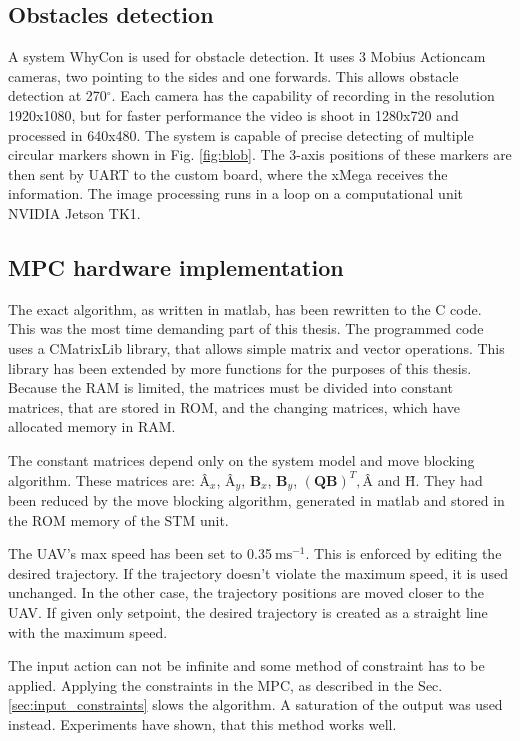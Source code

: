 \documentclass[a4paper,11pt,titlepage]{article}
\newcommand{\jed}[1]{\ensuremath{~\mathrm{#1}}}
\begin{document}
\subsection{Obstacles detection}
A system WhyCon\cite{whycon_icar}\cite{whycon_jint} is used for obstacle detection. It uses 3 Mobius Actioncam cameras, two pointing to the sides and one forwards. This allows obstacle detection at 270$^\circ$. Each camera has the capability of recording in the resolution 1920x1080, but for faster performance the video is shoot in 1280x720 and processed in 640x480. The system is capable of precise detecting of multiple circular markers shown in Fig. \ref{fig:blob}. The 3-axis positions of these markers are then sent by UART to the custom board, where the xMega receives the information. The image processing runs in a loop on a computational unit NVIDIA Jetson TK1.

\subsection{MPC hardware implementation}

The exact algorithm, as written in matlab, has been rewritten to the C code. This was the most time demanding part of this thesis. The programmed code uses a CMatrixLib library, that allows simple matrix and vector operations. This library has been extended by more functions for the purposes of this thesis. Because the RAM is limited, the matrices must be divided into constant matrices, that are stored in ROM, and the changing matrices, which have allocated memory in RAM.

The constant matrices depend only on the system model and move blocking algorithm. These matrices are: $\textbf{\^A}_x$, $\textbf{\^A}_y$, $\textbf{\^B}_x$, $\textbf{\^B}_y$, $(\textbf{\^Q}\textbf{\^B})^T, \textbf{\^A}$ and $\textbf{\^H}$. They had been reduced by the move blocking algorithm, generated in matlab and stored in the ROM memory of the STM unit. 

The UAV's max speed has been set to 0.35\jed{ms^{-1}}. This is enforced by editing the desired trajectory. If the trajectory doesn't violate the maximum speed, it is used unchanged. In the other case, the trajectory positions are moved closer to the UAV. If given only setpoint, the desired trajectory is created as a straight line with the maximum speed. 

The input action can not be infinite and some method of constraint has to be applied. Applying the constraints in the MPC, as described in the Sec. \ref{sec:input_constraints} slows the algorithm. A saturation of the output was used instead. Experiments have shown, that this method works well.
\end{document}
